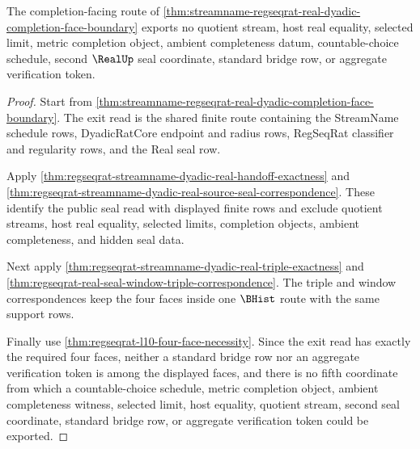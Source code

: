 \begin{theorem}
\label{thm:streamname-regseqrat-real-completion-face-nonescape}
The completion-facing route of \autoref{thm:streamname-regseqrat-real-dyadic-completion-face-boundary} exports no quotient stream, host real equality, selected limit, metric completion object, ambient completeness datum, countable-choice schedule, second $\RealUp$ seal coordinate, standard bridge row, or aggregate verification token.
\end{theorem}
\begin{proof}
Start from \autoref{thm:streamname-regseqrat-real-dyadic-completion-face-boundary}. The exit read is the shared finite route containing the StreamName schedule rows, DyadicRatCore endpoint and radius rows, RegSeqRat classifier and regularity rows, and the Real seal row.

Apply \autoref{thm:regseqrat-streamname-dyadic-real-handoff-exactness} and \autoref{thm:regseqrat-streamname-dyadic-real-source-seal-correspondence}. These identify the public seal read with displayed finite rows and exclude quotient streams, host real equality, selected limits, completion objects, ambient completeness, and hidden seal data.

Next apply \autoref{thm:regseqrat-streamname-dyadic-real-triple-exactness} and \autoref{thm:regseqrat-real-seal-window-triple-correspondence}. The triple and window correspondences keep the four faces inside one $\BHist$ route with the same support rows.

Finally use \autoref{thm:regseqrat-l10-four-face-necessity}. Since the exit read has exactly the required four faces, neither a standard bridge row nor an aggregate verification token is among the displayed faces, and there is no fifth coordinate from which a countable-choice schedule, metric completion object, ambient completeness witness, selected limit, host equality, quotient stream, second seal coordinate, standard bridge row, or aggregate verification token could be exported.
\end{proof}

